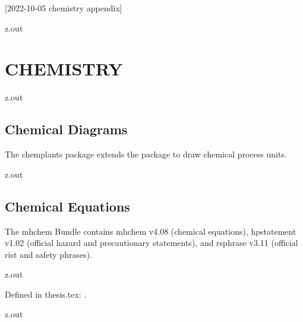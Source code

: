 [2022-10-05 chemistry appendix]

\begin{VerbatimOut}{z.out}
\chapter{CHEMISTRY}
\label{ch:chemistry}


\end{VerbatimOut}

\MyIO


\begin{VerbatimOut}{z.out}


\section{Chemical Diagrams}

The chemplants package
\cite{feffin2019}
extends the
\href{http://ctan.math.washington.edu/tex-archive/graphics/pgf/base/doc/pgfmanual.pdf}{\TikZLogo}
package
to draw chemical process units.
\end{VerbatimOut}

\MyIO


\begin{VerbatimOut}{z.out}


\section{Chemical Equations}

The mhchem Bundle
\cite{hensel2018}
contains mhchem v4.08 (chemical equations),
hpstatement v1.02 (official hazard and precautionary statements),
and rsphrase v3.11 (official rist and safety phrases).
\end{VerbatimOut}

\MyIO


\begin{VerbatimOut}{z.out}

Defined in thesis.tex: \nitrate.
\end{VerbatimOut}

\MyIO


\begin{VerbatimOut}{z.out}

\end{VerbatimOut}

